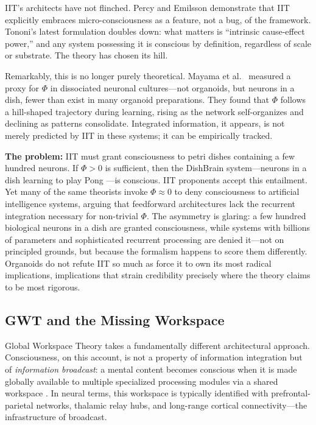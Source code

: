 IIT's architects have not flinched. Percy and Emilsson \cite{percy2025micro} demonstrate that IIT explicitly embraces micro-consciousness as a feature, not a bug, of the framework. Tononi's \cite{tononi2025intrinsic} latest formulation doubles down: what matters is ``intrinsic cause-effect power,'' and any system possessing it is conscious by definition, regardless of scale or substrate. The theory has chosen its hill.

Remarkably, this is no longer purely theoretical. Mayama et al.\ \cite{mayama2025phi} measured a proxy for $\Phi$ in dissociated neuronal cultures---not organoids, but neurons in a dish, fewer than exist in many organoid preparations. They found that $\Phi$ follows a hill-shaped trajectory during learning, rising as the network self-organizes and declining as patterns consolidate. Integrated information, it appears, is not merely predicted by IIT in these systems; it can be empirically tracked.

\textbf{The problem:} IIT must grant consciousness to petri dishes containing a few hundred neurons. If $\Phi > 0$ is sufficient, then the DishBrain system---neurons in a dish learning to play Pong \cite{kagan2022dishbrain}---is conscious. IIT proponents accept this entailment. Yet many of the same theorists invoke $\Phi \approx 0$ to deny consciousness to artificial intelligence systems, arguing that feedforward architectures lack the recurrent integration necessary for non-trivial $\Phi$. The asymmetry is glaring: a few hundred biological neurons in a dish are granted consciousness, while systems with billions of parameters and sophisticated recurrent processing are denied it---not on principled grounds, but because the formalism happens to score them differently. Organoids do not refute IIT so much as force it to own its most radical implications, implications that strain credibility precisely where the theory claims to be most rigorous.

\subsection{GWT and the Missing Workspace}

Global Workspace Theory takes a fundamentally different architectural approach. Consciousness, on this account, is not a property of information integration but of \textit{information broadcast}: a mental content becomes conscious when it is made globally available to multiple specialized processing modules via a shared workspace \cite{baars1988cognitive, dehaene2014toward}. In neural terms, this workspace is typically identified with prefrontal-parietal networks, thalamic relay hubs, and long-range cortical connectivity---the infrastructure of broadcast.

